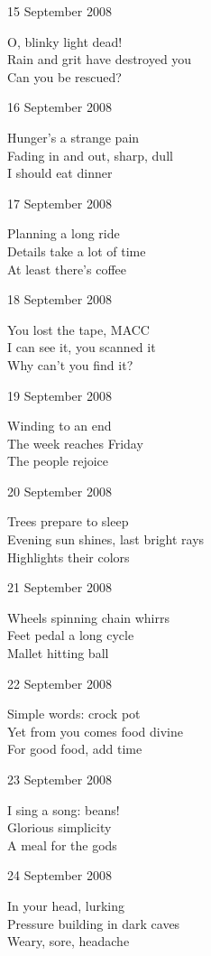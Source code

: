 \documentclass[12pt]{article}
\begin{document}
15 September 2008

O, blinky light dead! \\
Rain and grit have destroyed you \\
Can you be rescued?

16 September 2008

Hunger's a strange pain \\
Fading in and out, sharp, dull \\
I should eat dinner

17 September 2008

Planning a long ride \\
Details take a lot of time \\
At least there's coffee

18 September 2008

You lost the tape, MACC \\
I can see it, you scanned it \\
Why can't you find it?

\newpage

19 September 2008

Winding to an end \\
The week reaches Friday \\
The people rejoice

20 September 2008

Trees prepare to sleep \\
Evening sun shines, last bright rays \\
Highlights their colors

21 September 2008

Wheels spinning chain whirrs \\
Feet pedal a long cycle \\
Mallet hitting ball

22 September 2008

Simple words: crock pot \\
Yet from you comes food divine \\
For good food, add time

23 September 2008

I sing a song: beans! \\
Glorious simplicity \\
A meal for the gods

24 September 2008

In your head, lurking \\
Pressure building in dark caves \\
Weary, sore, headache
\end{document}

